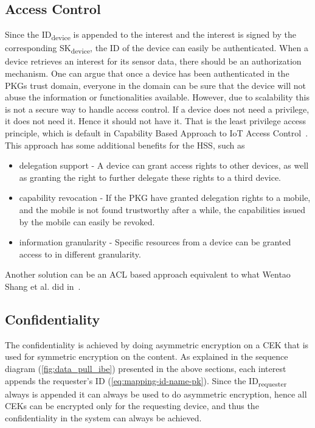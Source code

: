 \subsection{Access Control}\label{access_control}
Since the ID\textsubscript{device} is appended to the \gls{interest} and the \gls{interest} is signed by the corresponding SK\textsubscript{device}, the \gls{ID} of the device can easily be authenticated. 
When a device retrieves an \gls{interest} for its sensor \gls{data}, there should be an authorization mechanism. 
One can argue that once a device has been authenticated in the \gls{PKG}s trust domain, everyone in the domain can be sure that the device will not abuse the information or functionalities available. 
However, due to scalability this is not a secure way to handle access control. 
If a device does not need a privilege, it does not need it.
Hence it should not have it. 
That is the least privilege access principle, which is default in Capability Based Approach to \gls{IoT} Access Control~\cite{DBLP:conf/imis/GusmeroliPR12}.
This approach has some additional benefits for the \gls{HSS}, such as

\begin{itemize}
  \item delegation support - 
  A device can grant access rights to other devices, as well as granting the right to further delegate these rights to a third device.
  \item capability revocation - 
  If the \gls{PKG} have granted delegation rights to a mobile, and the mobile is not found trustworthy after a while, the capabilities issued by the mobile can easily be revoked.
  \item information granularity - 
  Specific resources from a device can be granted access to in different granularity.
\end{itemize}

Another solution can be an \gls{ACL} based approach equivalent to what Wentao Shang et al. did in~\cite{DBLP:journals/network/ShangDMBZ14}.

\subsection{Confidentiality}
The confidentiality is achieved by doing asymmetric encryption on a \gls{CEK} that is used for symmetric encryption on the content.
As explained in the sequence diagram (\autoref{fig:data_pull_ibe}) presented in the above sections, each \gls{interest} appends the requester's ID (\autoref{eq:mapping-id-name-pk}).
Since the ID\textsubscript{requester} always is appended it can always be used to do asymmetric encryption, hence all \gls{CEK}s can be encrypted only for the requesting device, and thus the confidentiality in the system can always be achieved.

